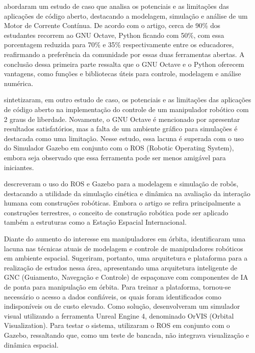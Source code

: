  abordaram um estudo de caso que analisa os potenciais e as limitações das aplicações de código aberto, destacando a modelagem, simulação e análise de um Motor de Corrente Contínua. De acordo com o artigo, cerca de 90\% dos estudantes recorrem ao GNU Octave, Python ficando com 50\%, com essa porcentagem reduzida para 70\% e 35\% respectivamente entre os educadores, reafirmando a preferência da comunidade por essas duas ferramentas abertas. A conclusão dessa primeira parte ressalta que o GNU Octave e o Python oferecem vantagens, como funções e bibliotecas úteis para controle, modelagem e análise numérica.

  sintetizaram, em outro estudo de caso, os potenciais e as limitações das aplicações de código aberto na implementação do controle de um manipulador robótico com 2 graus de liberdade. Novamente, o GNU Octave é mencionado por apresentar resultados satisfatórios, mas a falta de um ambiente gráfico para simulações é destacada como uma limitação. Nesse estudo, essa lacuna é superada com o uso do Simulador Gazebo em conjunto com o ROS (Robotic Operating System), embora seja observado que essa ferramenta pode ser menos amigável para iniciantes.

 descreveram o uso do ROS e Gazebo para a modelagem e simulação de robôs, destacando a utilidade da simulação cinética e dinâmica na avaliação da interação humana com construções robóticas. Embora o artigo se refira principalmente a construções terrestres, o conceito de construção robótica pode ser aplicado também a estruturas como a Estação Espacial Internacional.

Diante do aumento do interesse em manipuladores em órbita,  identificaram uma lacuna nas técnicas atuais de modelagem e controle de manipuladores robóticos em ambiente espacial. Sugeriram, portanto, uma arquitetura e plataforma para a realização de estudos nessa área, apresentando uma arquitetura inteligente de GNC (Guiamento, Navegação e Controle) de espaçonave com componentes de IA de ponta para manipulação em órbita. Para treinar a plataforma, tornou-se necessário o acesso a dados confiáveis, os quais foram identificados como indisponíveis ou de custo elevado. Como solução, desenvolveram um simulador visual utilizando a ferramenta Unreal Engine 4, denominado OrVIS (Orbital Visualization). Para testar o sistema, utilizaram o ROS em conjunto com o Gazebo, ressaltando que, como um teste de bancada, não integrava visualização e dinâmica espacial.

